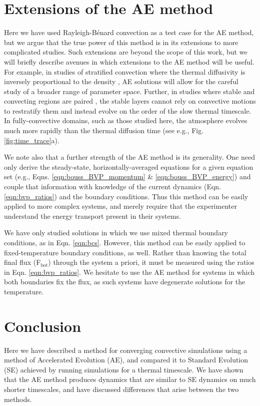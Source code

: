 \documentclass[aps, pre, onecolumn, nofootinbib, notitlepage, groupedaddress, amsfonts, amssymb, amsmath, longbibliography]{revtex4-1}
\newcommand{\RB}{Rayleigh-B\'{e}nard }
\begin{document}
\section{Extensions of the AE method}
\label{section:extensions}
Here we have used \RB convection as a test case for the AE method, but we argue that
the true power of this method is in its extensions to more complicated studies.
Such extensions are beyond the scope of this work, but we will briefly describe
avenues in which extensions to the AE method will be useful.
For example, in studies of stratified convection where the thermal diffusivity
is inversely proportional to the density \cite{anders&brown2017}, AE solutions
will allow for the careful study of a broader range of parameter space. 
Further, in studies where stable and convecting regions are paired
\cite{hurlburt&all1986, couston&all2017}, the stable layers cannot rely on convective
motions to restratify them and instead evolve on the order of the slow thermal
timescale. In
fully-convective domains, such as those studied here, the atmosphere evolves
much more rapidly than the thermal diffusion time (see e.g., Fig. \ref{fig:time_trace}a).

We note also that a further strength of the AE method is its generality.  One
need only derive the steady-state, horizontally-averaged equations for a given
equation set (e.g., Eqns. \ref{eqn:bouss_BVP_momentum} \& \ref{eqn:bouss_BVP_energy})
and couple that information with knowledge of the current dynamics (Eqn. \ref{eqn:bvp_ratios})
and the boundary conditions. Thus this method can be easily applied to more complex
systems, and merely require that the experimenter understand the energy transport
present in their systems.

We have only studied solutions in which we use mixed thermal boundary conditions,
as in Eqn. \ref{eqn:bcs}. However, this method can be easily applied to fixed-temperature
boundary conditions, as well.  Rather than knowing the total final flux (F$_{\text{bot}}$)
through the system a priori, it must be measured using the ratios in
Eqn. \ref{eqn:bvp_ratios}.  We hesitate to use the AE method for systems in which
both boundaries fix the flux, as such systems have degenerate solutions for the temperature.


\section{Conclusion}
\label{sec:discussion}
Here we have described a method for converging convective simulations using
a method of Accelerated Evolution (AE), and compared it to Standard
Evolution (SE) achieved by running simulations for a thermal timescale.
We have shown that the AE method produces dynamics that are similar to SE
dynamics on much shorter timescales, and have discussed differences that arise
between the two methods.
\end{document}
